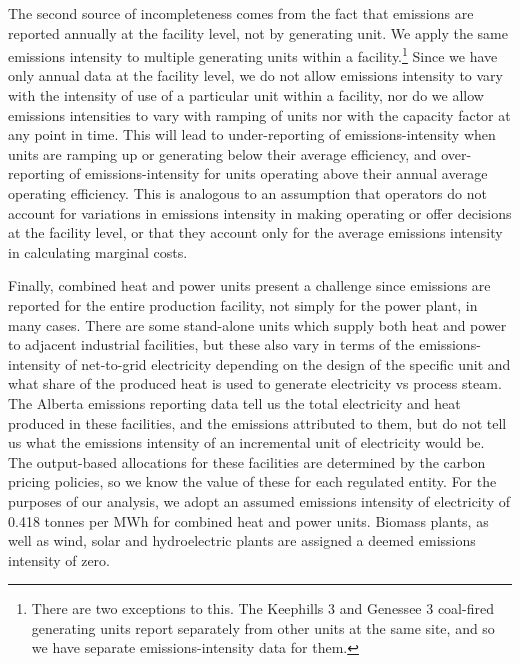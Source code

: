 \documentclass[12pt]{article}
\begin{document}
The second source of incompleteness comes from the fact that emissions are reported annually at the facility level, not by generating unit. We apply the same emissions intensity to multiple generating units within a facility.\footnote{There are two exceptions to this. The Keephills 3 and Genessee 3 coal-fired generating units report separately from other units at the same site, and so we have separate emissions-intensity data for them.} Since we have only annual data at the facility level, we do not allow emissions intensity to vary with the intensity of use of a particular unit within a facility, nor do we allow emissions intensities to vary with ramping of units nor with the capacity factor at any point in time. This will lead to under-reporting of emissions-intensity when units are ramping up or generating below their average efficiency, and over-reporting of emissions-intensity for units operating above their annual average operating efficiency. This is analogous to an assumption that operators do not account for variations in emissions intensity in making operating or offer decisions at the facility level, or that they account only for the average emissions intensity in calculating marginal costs.

Finally, combined heat and power units present a challenge since emissions are reported for the entire production facility, not simply for the power plant, in many cases. There are some stand-alone units which supply both heat and power to adjacent industrial facilities, but these also vary in terms of the emissions-intensity of net-to-grid electricity depending on the design of the specific unit and what share of the produced heat is used to generate electricity vs process steam. The Alberta emissions reporting data tell us the total electricity and heat produced in these facilities, and the emissions attributed to them, but do not tell us what the emissions intensity of an incremental unit of electricity would be. The output-based allocations for these facilities are determined by the carbon pricing policies, so we know the value of these for each regulated entity. For the purposes of our analysis, we adopt an assumed emissions intensity of electricity of 0.418 tonnes per MWh for combined heat and power units. Biomass plants, as well as wind, solar and hydroelectric plants are assigned a deemed emissions intensity of zero.
\end{document}
